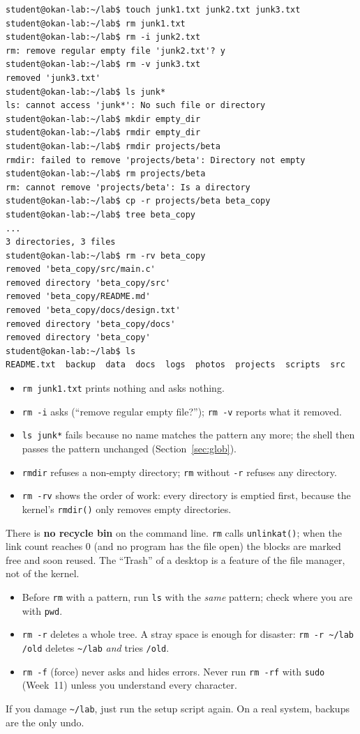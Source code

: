 \documentclass[11pt,a4paper]{article}
\newcommand{\cmd}[1]{\texttt{#1}}
\begin{document}
\begin{lstlisting}[style=term]
student@okan-lab:~/lab$ touch junk1.txt junk2.txt junk3.txt
student@okan-lab:~/lab$ rm junk1.txt
student@okan-lab:~/lab$ rm -i junk2.txt
rm: remove regular empty file 'junk2.txt'? y
student@okan-lab:~/lab$ rm -v junk3.txt
removed 'junk3.txt'
student@okan-lab:~/lab$ ls junk*
ls: cannot access 'junk*': No such file or directory
student@okan-lab:~/lab$ mkdir empty_dir
student@okan-lab:~/lab$ rmdir empty_dir
student@okan-lab:~/lab$ rmdir projects/beta
rmdir: failed to remove 'projects/beta': Directory not empty
student@okan-lab:~/lab$ rm projects/beta
rm: cannot remove 'projects/beta': Is a directory
student@okan-lab:~/lab$ cp -r projects/beta beta_copy
student@okan-lab:~/lab$ tree beta_copy
...
3 directories, 3 files
student@okan-lab:~/lab$ rm -rv beta_copy
removed 'beta_copy/src/main.c'
removed directory 'beta_copy/src'
removed 'beta_copy/README.md'
removed 'beta_copy/docs/design.txt'
removed directory 'beta_copy/docs'
removed directory 'beta_copy'
student@okan-lab:~/lab$ ls
README.txt  backup  data  docs  logs  photos  projects  scripts  src
\end{lstlisting}

\begin{itemize}
  \item \cmd{rm junk1.txt} prints nothing and asks nothing.
  \item \cmd{rm -i} asks (``remove regular empty file?''); \cmd{rm -v} reports what it removed.
  \item \cmd{ls junk*} fails because no name matches the pattern any more; the shell then passes the pattern unchanged (Section~\ref{sec:glob}).
  \item \cmd{rmdir} refuses a non-empty directory; \cmd{rm} without \cmd{-r} refuses any directory.
  \item \cmd{rm -rv} shows the order of work: every directory is emptied first, because the kernel's \cmd{rmdir()} only removes empty directories.
\end{itemize}

\begin{keyidea}
There is \textbf{no recycle bin} on the command line. \cmd{rm} calls \cmd{unlinkat()}; when the link count reaches $0$ (and no program has the file open) the blocks are marked free and soon reused. The ``Trash'' of a desktop is a feature of the file manager, not of the kernel.
\begin{itemize}
  \item Before \cmd{rm} with a pattern, run \cmd{ls} with the \emph{same} pattern; check where you are with \cmd{pwd}.
  \item \cmd{rm -r} deletes a whole tree. A stray space is enough for disaster: \cmd{rm -r \textasciitilde/lab /old} deletes \texttt{\textasciitilde/lab} \emph{and} tries \texttt{/old}.
  \item \cmd{rm -f} (force) never asks and hides errors. Never run \cmd{rm -rf} with \cmd{sudo} (Week~11) unless you understand every character.
\end{itemize}
If you damage \texttt{\textasciitilde/lab}, just run the setup script again. On a real system, backups are the only undo.
\end{keyidea}
\end{document}
